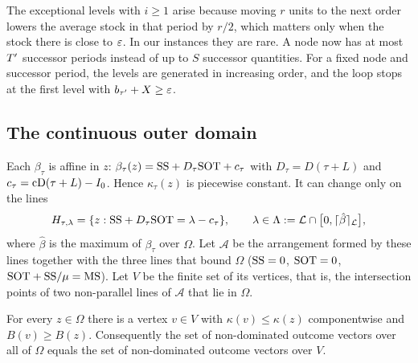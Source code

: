 \begin{remark}
  The exceptional levels with $i\ge1$ arise because moving $r$ units to the next order lowers
  the average stock in that period by $r/2$, which matters only when the stock there is close
  to $\varepsilon$. In our instances they are rare. A node now has at most $T'$ successor periods
  instead of up to $S$ successor quantities. For a fixed node and successor period, the
  levels are generated in increasing order, and the loop stops at the first level with
  $b_{\tau'}+X\ge\varepsilon$.
\end{remark}

\subsection{The continuous outer domain}\label{app:continuous}

Each $\beta_\tau$ is affine in $z$: $\beta_\tau(z)=\mathrm{SS}+D_\tau\mathrm{SOT}+c_\tau$ with
$D_\tau=D(\tau+L)$ and $c_\tau=\mathrm{cD}(\tau+L)-I_0$. Hence $\kappa_\tau(z)$ is piecewise
constant. It can change only on the lines
\begin{equation}
  H_{\tau,\lambda}=\{z : \mathrm{SS}+D_\tau\mathrm{SOT}=\lambda-c_\tau\},\qquad
  \lambda\in\Lambda:=\mathcal{L}\cap\bigl[0,\lceil \hat\beta\rceil_{\mathcal{L}}\bigr],
\end{equation}
where $\hat\beta$ is the maximum of $\beta_\tau$ over $\Omega$. Let $\mathcal{A}$ be the
arrangement formed by these lines together with the three lines that bound $\Omega$
($\mathrm{SS}=0$, $\mathrm{SOT}=0$, $\mathrm{SOT}+\mathrm{SS}/\mu=\mathrm{MS}$). Let $V$ be the finite set of its vertices,
that is, the intersection points of two non-parallel lines of $\mathcal{A}$ that lie in
$\Omega$.

\begin{theorem}\label{thm:vertex}
  For every $z\in\Omega$ there is a vertex $v\in V$ with $\kappa(v)\le\kappa(z)$
  componentwise and $B(v)\ge B(z)$. Consequently the set of non-dominated outcome vectors
  over all of $\Omega$ equals the set of non-dominated outcome vectors over $V$.
\end{theorem}

